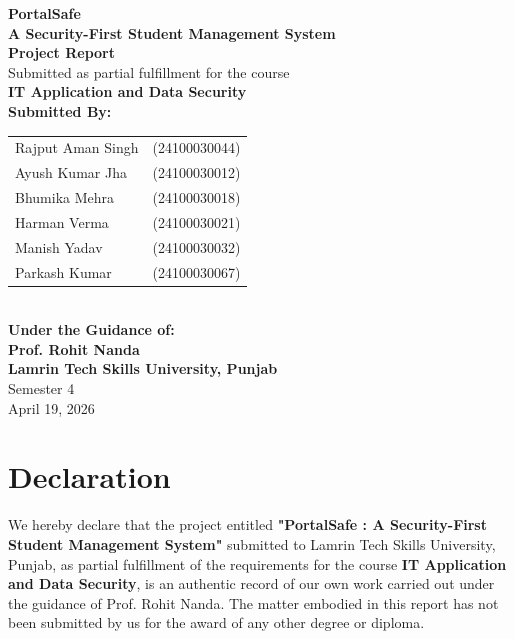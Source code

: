 \documentclass[12pt,a4paper]{report}
\begin{document}
\begin{titlepage}
    \centering
    \vspace*{1cm}
    
    {\Huge \textbf{\textcolor{primaryblue}{PortalSafe}}} \\[0.5cm]
    {\LARGE \textbf{A Security-First Student Management System}} \\[1.5cm]
    
    {\Large \textbf{Project Report}} \\[0.5cm]
    {\large Submitted as partial fulfillment for the course} \\[0.2cm]
    {\large \textbf{IT Application and Data Security}} \\[2cm]
    
    \textbf{Submitted By:}\\[0.2cm]
    \begin{tabular}{ll}
        Rajput Aman Singh & (24100030044) \\
        Ayush Kumar Jha & (24100030012) \\
        Bhumika Mehra & (24100030018) \\
        Harman Verma & (24100030021) \\
        Manish Yadav & (24100030032) \\
        Parkash Kumar & (24100030067) \\
    \end{tabular} \\[2cm]
    
    \textbf{Under the Guidance of:}\\[0.2cm]
    {\Large \textbf{Prof. Rohit Nanda}} \\[2cm]
    
    {\Large \textbf{Lamrin Tech Skills University, Punjab}}\\[0.5cm]
    
    {\large Semester 4} \\[0.5cm]
    {\large April 19, 2026}
\end{titlepage}

\chapter*{Declaration}
We hereby declare that the project entitled \textbf{"PortalSafe : A Security-First Student Management System"} submitted to Lamrin Tech Skills University, Punjab, as partial fulfillment of the requirements for the course \textbf{IT Application and Data Security}, is an authentic record of our own work carried out under the guidance of Prof. Rohit Nanda. The matter embodied in this report has not been submitted by us for the award of any other degree or diploma.
\end{document}
